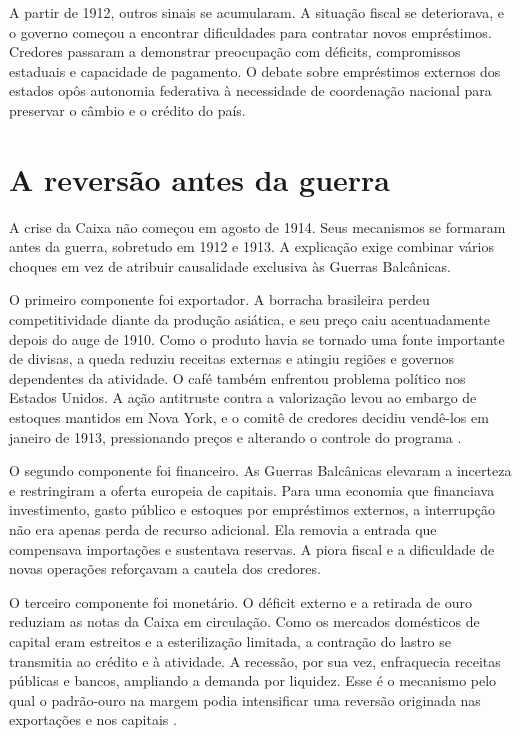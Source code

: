 A partir de 1912, outros sinais se acumularam. A situação fiscal se deteriorava, e o governo começou a encontrar dificuldades para contratar novos empréstimos. Credores passaram a demonstrar preocupação com déficits, compromissos estaduais e capacidade de pagamento. O debate sobre empréstimos externos dos estados opôs autonomia federativa à necessidade de coordenação nacional para preservar o câmbio e o crédito do país.


\section{A reversão antes da guerra}

A crise da Caixa não começou em agosto de 1914. Seus mecanismos se formaram antes da guerra, sobretudo em 1912 e 1913. A explicação exige combinar vários choques em vez de atribuir causalidade exclusiva às Guerras Balcânicas.

O primeiro componente foi exportador. A borracha brasileira perdeu competitividade diante da produção asiática, e seu preço caiu acentuadamente depois do auge de 1910. Como o produto havia se tornado uma fonte importante de divisas, a queda reduziu receitas externas e atingiu regiões e governos dependentes da atividade. O café também enfrentou problema político nos Estados Unidos. A ação antitruste contra a valorização levou ao embargo de estoques mantidos em Nova York, e o comitê de credores decidiu vendê-los em janeiro de 1913, pressionando preços e alterando o controle do programa \cite{fritsch1990,francolago2011}.

O segundo componente foi financeiro. As Guerras Balcânicas elevaram a incerteza e restringiram a oferta europeia de capitais. Para uma economia que financiava investimento, gasto público e estoques por empréstimos externos, a interrupção não era apenas perda de recurso adicional. Ela removia a entrada que compensava importações e sustentava reservas. A piora fiscal e a dificuldade de novas operações reforçavam a cautela dos credores.

O terceiro componente foi monetário. O déficit externo e a retirada de ouro reduziam as notas da Caixa em circulação. Como os mercados domésticos de capital eram estreitos e a esterilização limitada, a contração do lastro se transmitia ao crédito e à atividade. A recessão, por sua vez, enfraquecia receitas públicas e bancos, ampliando a demanda por liquidez. Esse é o mecanismo pelo qual o padrão-ouro na margem podia intensificar uma reversão originada nas exportações e nos capitais \cite{oliveirasilva2001,fritschfranco1992}.

